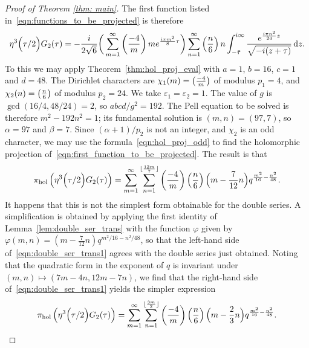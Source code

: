 \documentclass[11pt,reqno]{amsart}
\newcommand{\holoproj}[1]{\pi_{\mathrm{hol}}\left(#1\right)}
\renewcommand{\=}{\;=\;}
\theoremstyle{myremark}
\newcommand{\dd}{\mathrm{d}}
\begin{document}
\begin{proof}[Proof of Theorem \ref{thm: main}]
The first function listed in~\eqref{eqn:functions_to_be_projected} is therefore
\begin{equation} \label{eqn:first_function_to_be_projected}
\eta^3\Big({\tau/ 2}\Big)G_{2}(\tau) = -{i \over 2\sqrt{6}} \bigg( \sum_{m=1}^\infty \left({-4 \over m}\right) m e^{{i\pi m^2 \over 8}\tau} \bigg) \sum_{n=1}^\infty \left({n \over 6}\right) n \int_{-\bar{\tau}}^{i\infty} {e^{{i\pi  n^2 \over 24}z} \over \sqrt{-i(z+\tau)}} \, \dd z.
\end{equation}
To this we may apply Theorem~\ref{thm:hol_proj_eval} with $a=1$, $b=16$, $c=1$ and $d=48$. The Dirichlet characters are $\chi_1(m) = \left({-4 \over m}\right)$ of modulus $p_1=4$, and $\chi_2(n) = \left({n\over6}\right)$ of modulus $p_2=24$. We take $\varepsilon_1=\varepsilon_2=1$. The value of $g$ is $\gcd(16/4,48/24)=2$, so $abcd/g^2=192$. The Pell equation to be solved is therefore $m^2-192n^2=1$; its fundamental solution is $(m,n)=(97,7)$, so $\alpha=97$ and $\beta=7$. Since $(\alpha+1)/p_2$ is not an integer, and $\chi_2$ is an odd character, we may use the formula~\eqref{eqn:hol_proj_odd} to find the holomorphic projection of~\eqref{eqn:first_function_to_be_projected}. The result is that
\[ 
\holoproj{ \eta^3\Big({\tau / 2}\Big)G_{2}(\tau) }= \sum_{m=1}^\infty \sum_{n=1}^{\lfloor {12m \over 7}\rfloor} \left({-4 \over m}\right) \left({n \over 6}\right) \Big( m-{7 \over 12}n \Big) q^{{m^2 \over 16}-{n^2 \over 48}}. 
\]
It happens that this is not the simplest form obtainable for the double series. A simplification is obtained by applying the first identity of Lemma~\ref{lem:double_ser_trans} with the function $\varphi$ given by $\varphi(m,n) = (m-\tfrac{7}{12}n)q^{m^2/16-n^2/48}$, so that the left-hand side of~\eqref{eqn:double_ser_trans1} agrees with the double series just obtained. Noting that the quadratic form in the exponent of $q$ is invariant under $(m,n) \mapsto (7m-4n,12m-7n)$, we find that the right-hand side of~\eqref{eqn:double_ser_trans1} yields the simpler expression
\[ 
\holoproj{\eta^3\Big({\tau / 2}\Big)G_{2}(\tau)} = \sum_{m=1}^\infty \sum_{n=1}^{\lfloor {3m \over 2}\rfloor} \left({-4 \over m}\right) \left({n \over 6}\right) \Big( m-{2 \over 3}n \Big) q^{{m^2 \over 16}-{n^2 \over 48}}. \]


\end{proof}
\end{document}
